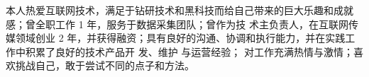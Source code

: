 

\begin{cvparagraph}

本人热爱互联网技术，满足于钻研技术和黑科技而给自己带来的巨大乐趣和成就感；曾全职工作 1 年，服务于数据采集团队；曾作为技 术主负责人，在互联网传媒领域创业 2 年，并获得融资；具有良好的沟通、协调和执行能力，并在实践工作中积累了良好的技术产品开 发、维护 与运营经验； 对工作充满热情与激情；喜欢挑战自己，敢于尝试不同的点子和方法。
\end{cvparagraph}
